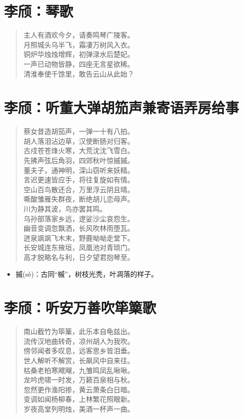 \documentclass[12pt,oneside]{book}
\newenvironment{shici}{%
\begin{verse}\centering\yanti\large\hspace{12pt}}{\end{verse}}
\begin{document}
\begin{common-format}
\chapter{李颀：琴歌}
\begin{shici}
主人有酒欢今夕，请奏鸣琴广陵客。\\
月照城头乌半飞，霜凄万树风入衣。\\
铜炉华烛烛增辉，初弹渌水后楚妃。\\
一声已动物皆静，四座无言星欲稀。\\
清淮奉使千馀里，敢告云山从此始？
\end{shici}

\chapter{李颀：听董大弹胡笳声兼寄语弄房给事}
\begin{shici}
蔡女昔造胡笳声，一弹一十有八拍。\\
胡人落泪沾边草，汉使断肠对归客。\\
古戍苍苍烽火寒，大荒沈沈飞雪白。\\
先拂声弦后角羽，四郊秋叶惊摵摵。\\
董夫子，通神明，深山窃听来妖精。\\
言迟更速皆应手，将往复旋如有情。\\
空山百鸟散还合，万里浮云阴且晴。\\
嘶酸雏雁失群夜，断绝胡儿恋母声。\\
川为静其波，鸟亦罢其鸣。\\
乌孙部落家乡远，逻娑沙尘哀怨生。\\
幽音变调忽飘洒，长风吹林雨堕瓦。\\
迸泉飒飒飞木末，野鹿呦呦走堂下。\\
长安城连东掖垣，凤凰池对青琐门。\\
高才脱略名与利，日夕望君抱琴至。
\end{shici}

\begin{itemize}
\item 摵(sè)：古同“槭”，树枝光秃，叶凋落的样子。
\end{itemize}

\chapter{李颀：听安万善吹筚篥歌}
\begin{shici}
南山截竹为筚篥，此乐本自龟兹出。\\
流传汉地曲转奇，凉州胡人为我吹。\\
傍邻闻者多叹息，远客思乡皆泪垂。\\
世人解听不解赏，长飙风中自来往。\\
枯桑老柏寒飕飗，九雏鸣凤乱啾啾。\\
龙吟虎啸一时发，万籁百泉相与秋。\\
忽然更作渔阳掺，黄云萧条白日暗。\\
变调如闻杨柳春，上林繁花照眼新。\\
岁夜高堂列明烛，美酒一杯声一曲。
\end{shici}


\end{common-format}
\end{document}
